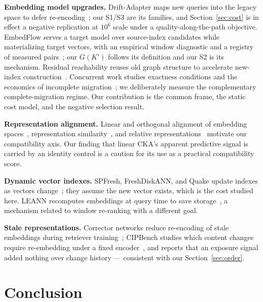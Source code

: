 \documentclass[conference]{IEEEtran}
\begin{document}
\textbf{Embedding model upgrades.} Drift-Adapter maps new queries into the legacy space
to defer re-encoding~\cite{drift-adapter}; our S1/S3 are its families, and
Section~\ref{sec:cost} is in effect a negative replication at $10^6$ scale under a
quality-along-the-path objective. EmbedFlow serves a target model over source-index
candidates while materializing target vectors, with an empirical window diagnostic and a
registry of measured pairs~\cite{embedflow}; our $G(K')$ follows its definition and our S2
is its mechanism. Residual reachability reuses old graph structure to accelerate
new-index construction~\cite{dgm}. Concurrent work studies exactness conditions and the
economics of incomplete migration~\cite{thaw-anon}; we deliberately measure the
complementary complete-migration regime. Our contribution is the common frame, the static
cost model, and the negative selection result.

\textbf{Representation alignment.} Linear and orthogonal alignment of embedding
spaces~\cite{procrustes}, representation similarity~\cite{cka}, and relative
representations~\cite{relrep} motivate our compatibility axis. Our finding that linear
CKA's apparent predictive signal is carried by an identity control is a caution for its
use as a practical compatibility score.

\textbf{Dynamic vector indexes.} SPFresh, FreshDiskANN, and Quake update indexes as
vectors change~\cite{spfresh,freshdiskann,quake}; they assume the new vector exists, which
is the cost studied here. LEANN recomputes embeddings at query time to save
storage~\cite{leann}, a mechanism related to window re-ranking with a different goal.

\textbf{Stale representations.} Corrector networks reduce re-encoding of stale embeddings
during retriever training~\cite{corrector}; CIPBench studies which content changes require
re-embedding under a fixed encoder~\cite{cipbench}, and reports that an exposure signal
added nothing over change history --- consistent with our Section~\ref{sec:order}.

\section{Conclusion}
\end{document}
